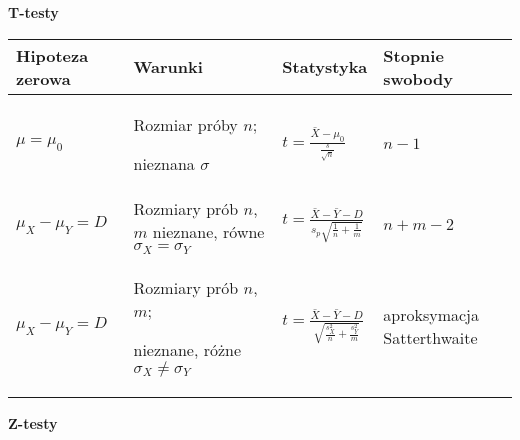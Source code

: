 \documentclass[main.tex]{subfiles}
\begin{document}
    \textbf{T-testy}

    \begin{table}[H]
        \begin{center}
            \begin{tabular}{ p{} |p{} |p{} |p{}}
                \toprule
                Hipoteza zerowa & Warunki & Statystyka & Stopnie swobody\\
                \toprule

                $\mu = \mu_0$ & Rozmiar próby $n$;

                nieznana $\sigma$ & $t = \frac{\bar{X} - \mu_0}{\frac{s}{\sqrt{n}}}$ & $n-1$\\

                \cmidrule(r){1-4}

                $\mu_X - \mu_Y = D$ & Rozmiary prób $n$, $m$
                nieznane, równe $\sigma_X = \sigma_Y$ & $t = \frac{\bar{X} - \bar{Y} - D}{s_p\sqrt{\frac{1}{n}+\frac{1}{m}}}$
                & $n+m-2$\\

                \cmidrule(r){1-4}

                $\mu_X - \mu_Y = D$ & Rozmiary prób $n$, $m$;

                nieznane, różne $\sigma_X \neq \sigma_Y$ & $t = \frac{\bar{X} - \bar{Y} - D}{\sqrt{\frac{s_X^2}{n} + \frac{s_Y^2}{m}}}$
                & aproksymacja Satterthwaite\\

                \bottomrule
            \end{tabular}
        \end{center}
    \end{table}

    \newpage

    \textbf{Z-testy}
\end{document}
